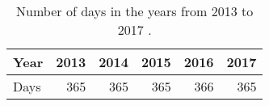 \begin{table}[H]
	\caption{Number of days in the years from 2013 to 2017 \citep{BEIS2018REs}.}
	\label{tbl:days}
	\centering
	\begin{tabular}{@{}lrrrrr@{}}
		\toprule
		Year & 2013 & 2014 & 2015 & 2016 & 2017 \\ \midrule
		Days & 365 & 365 & 365 & 366 & 365 \\ \bottomrule
	\end{tabular}
\end{table}